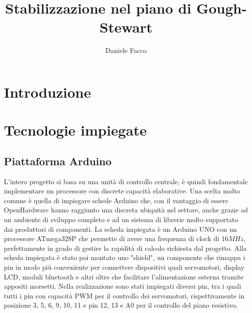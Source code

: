 \documentclass[11pt]{article}
\title{Stabilizzazione nel piano di Gough-Stewart}
\author{Daniele Facco}
\date{}
\begin{document}
\maketitle
\tableofcontents
\newpage


\section{Introduzione}\label{intro}


\section{Tecnologie impiegate}\label{tecnologie}

\subsection{Piattaforma Arduino}\label{arduino}
L'intero progetto si basa su una unità di controllo centrale, è quindi fondamentale implementare un processore con discrete capacità elaborative. Una scelta molto comune è quella di impiegare schede Arduino che, con il vantaggio di essere OpenHardware hanno raggiunto una discreta ubiquità nel settore, anche grazie ad un ambiente di sviluppo completo e ad un sistema di librerie molto supportato dai produttori di componenti. La scheda impiegata è un Arduino UNO con un processore ATmega328P che permette di avere una frequenza di clock di $16MHz$, perfettamente in grado di gestire la rapidità di calcolo richiesta dal progetto. Alla scheda impiegata è stato poi montato uno "shield", un componente che rimappa i pin in modo più conveniente per connettere dispositivi quali servomotori, display LCD, moduli bluetooth e altri oltre che facilitare l'alimentazione esterna tramite appositi morsetti. Nella realizzazione sono stati impiegati diversi pin, tra i quali tutti i pin con capacità PWM per il controllo dei servomotori, rispettivamente in posizione 3, 5, 6, 9, 10, 11 e pin 12, 13 e A0 per il controllo del piano resistivo.
\end{document}

